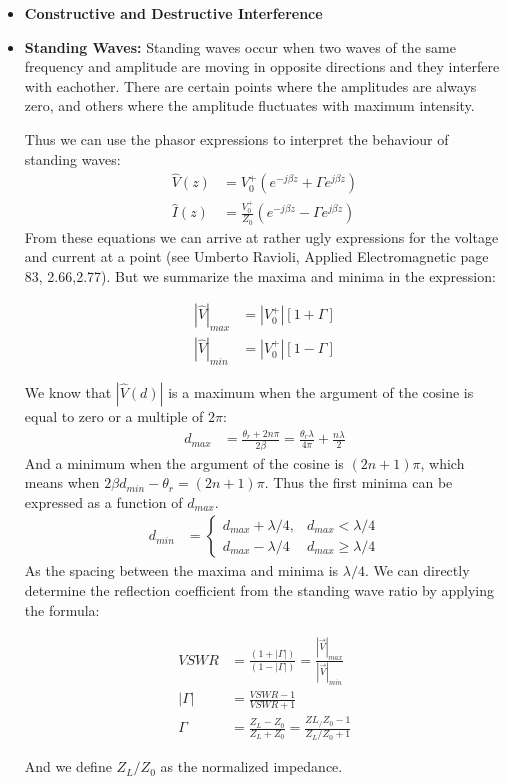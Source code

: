 \documentclass{book}
\begin{document}
\begin{itemize}
	\item \textbf{Constructive and Destructive Interference}
	\item \textbf{Standing Waves:} Standing waves occur when two waves of the same frequency and amplitude are moving in opposite directions and they interfere with eachother. There are certain points where the amplitudes are always zero, and others where the amplitude fluctuates with maximum intensity.
	
	Thus we can use the phasor expressions to interpret the behaviour of standing waves:
	\begin{align*}
		\hat{V}(z) &= V_0 ^+ (e^{-j\beta z}+ \Gamma e^{j\beta z}) \\
		\hat{I}(z) &= \frac{V^+_0}{Z_0}(e^{-j\beta z}- \Gamma e^{j\beta z})
	\end{align*}
	From these equations we can arrive at rather ugly expressions for the voltage and current at a point (see Umberto Ravioli, Applied Electromagnetic page 83, 2.66,2.77). But we summarize the maxima and minima in the expression:
	
	\begin{align*}
		|\hat{V}|_{max} &= |V_0^+| [1+ \Gamma] \\
		|\hat{V}|_{min} &= |V_0^+| [1- \Gamma]
	\end{align*}
	
	We know that $|\hat{V}(d)|$ is a maximum when the argument of the cosine is equal to zero or a multiple of $2\pi$:
	\begin{align*}
		d_{max} &= \frac{\theta_r + 2n\pi}{2\beta} = \frac{\theta_r \lambda}{4 \pi} + \frac{n\lambda}{2}
	\end{align*}
	And a minimum when the argument of the cosine is $(2n+1)\pi$, which means when $2\beta d_{min} - \theta_r = (2n+1)\pi$. Thus the first minima can be expressed  as a function of $d_{max}$.
	\begin{align*}
		d_{min} &= 
		\begin{cases}
			d_{max} + \lambda /4, & d_{max} < \lambda /4 \\
			d_{max} - \lambda /4 & d_{max} \geq \lambda /4	
		\end{cases}
	\end{align*}
	 As the spacing between the maxima and minima is $\lambda/4$. We can directly determine the reflection coefficient from the standing wave ratio by applying the formula:
	
	\begin{align*}
		VSWR &= \frac{(1 + |\Gamma|)}{(1 - |\Gamma|)} = \frac{|\vec{V}|_{max}}{|\vec{V}|_{min}} \\
		|\Gamma| &= \frac{VSWR - 1}{VSWR + 1} \\
		\Gamma &= \frac{Z_L - Z_0}{Z_L + Z_0} = \frac{ZL_/Z_0 - 1}{Z_L/Z_0 + 1}
	\end{align*}
	
	And we define $Z_L/Z_0$ as the normalized impedance.
\end{itemize}
\end{document}
